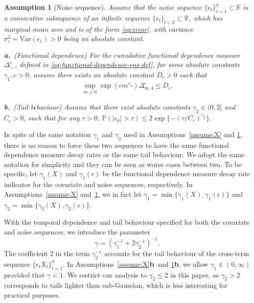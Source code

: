 \documentclass[11pt]{article}
\theoremstyle{plain}
\newtheorem{assumption}{Assumption}
\theoremstyle{definition}
\begin{document}
\begin{assumption}[Noise sequence] \label{assume:epsilon}	
Assume that the noise sequence $\{\epsilon_t\}_{t=1}^n \subset \mathbb{R}$ is a consecutive subsequence of an infinite sequence $\{\epsilon_t\}_{t \in \mathbb{Z}} \subset \mathbb{R}$, which has marginal mean zero and is of the form \eqref{eq:error}, with variance $\sigma_{\epsilon}^2 = \mathrm{Var}(\epsilon_1) > 0$ being an absolute constant.

\noindent \textbf{a.}~(Functional dependence)  For the cumulative functional dependence measure $\Delta_{\cdot, \cdot}^{\epsilon}$, defined in \eqref{eq-functional-dependence-eps-def}, for some absolute constants $\gamma_1, c > 0$, assume there exists an absolute constant $D_{\epsilon} > 0$ such that   
\begin{align}\label{eq:epsilon temporal dependence}
    \sup_{m \geq 0}\exp(cm^{\gamma_1})\Delta_{m, 4}^\epsilon \leq D_\epsilon.
\end{align}  

\noindent \textbf{b.}~(Tail behaviour) Assume that there exist absolute constants $\gamma_2 \in (0, 2]$ and $C_{\epsilon} > 0$, such that for any $\tau >0$, $\mathbb{P}(|\epsilon_0| >  \tau) \leq 2\exp\{-(\tau/C_\epsilon)^{\gamma_2}\}$.
\end{assumption}

In spite of the same notation $\gamma_1$ and $\gamma_2$ used in Assumptions~\ref{assume:X} and \ref{assume:epsilon}, there is no reason to force these two sequences to have the same functional dependence measure decay rates or the same tail behaviour. We adopt the same notation for simplicity and they can be seen as worse cases between two.  To be specific, let $\gamma_1(X)$ and $\gamma_1(\epsilon)$ be the functional dependence measure decay rate indicator for the covariate and noise sequences, respectively.  In Assumptions~\ref{assume:X} and~\ref{assume:epsilon}, we in fact let $\gamma_1 = \min\{\gamma_1(X), \gamma_1(\epsilon)\}$ and $\gamma_2 = \min\{\gamma_2(X), \gamma_2(\epsilon)\}$.  

With the temporal dependence and tail behaviour specified for both the covariate and noise sequences, we introduce the parameter
\begin{equation}\label{eq-gamma-def}
    \gamma = \left(\gamma_1^{-1} + 2 \gamma_2^{-1}\right)^{-1}.
\end{equation}
The coefficient 2 in the term $\gamma_2^{-1}$ accounts for the tail behaviour of the cross-term sequence $\{\epsilon_t X_t\}_{t = 1}^n$.  In Assumptions~\ref{assume:X}\textbf{b}~and \ref{assume:epsilon}\textbf{b}, we allow $\gamma_1 \in (0, \infty)$ provided that $\gamma < 1$. We restrict our analysis to $\gamma_2 \leq 2$ in this paper, as $\gamma_2>2$ corresponds to tails lighter than sub-Gaussian, which is less interesting for practical purposes. %
\end{document}
